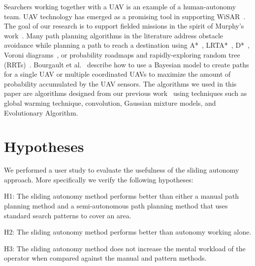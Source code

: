 Searchers working together with a UAV is an example of a human-autonomy team. UAV technology has emerged as a promising tool in supporting WiSAR~\cite{Murphy2008Cooperative,Bourgault2003Coordinated}. The goal of our research is to support fielded missions in the spirit of Murphy's work~\cite{Casper2003Human}. Many path planning algorithms in the literature address obstacle avoidance while planning a path to reach a destination using A*~\cite{Quigley2005Towards}, LRTA*~\cite{Howlett2006Learning}, D*~\cite{Stentz1997Optimal}, Voroni diagrams~\cite{Bortoff2000Path,Beard2005Autonomous}, or probability roadmaps and rapidly-exploring random tree (RRTs)~\cite{Pettersson2006Probabilistic}. 
Bourgault et al.\ \cite{Bourgault2004Coordinated,Bourgault2006Optimal} describe how to use a Bayesian model to create paths for a single UAV or multiple coordinated UAVs to maximize the amount of probability accumulated by the UAV sensors. The algorithms we used in this paper are algorithms designed from our previous work~\cite{Lin2009UAV,Lin2014Hierarchical} using techniques such as global warming technique, convolution, Gaussian mixture models, and Evolutionary Algorithm.

\section{Hypotheses} 
\label{sec:Hypotheses}

We performed a user study to evaluate the usefulness of the sliding autonomy approach. More specifically we verify the following hypotheses:

H1: The sliding autonomy method performs better than either a manual path planning method and a semi-autonomous path planning method that uses standard search patterns to cover an area.

H2: The sliding autonomy method performs better than autonomy working alone.

H3: The sliding autonomy method does not increase the mental workload of the operator when compared against the manual and pattern methods.

